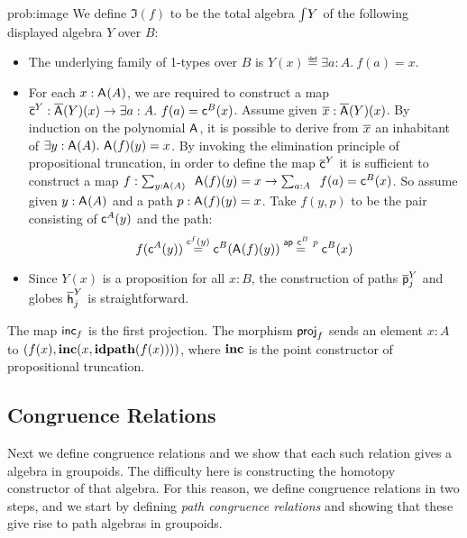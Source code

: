 \begin{construction}{prob:image}
We define $\Im(f)$ to be the total algebra $\textstyle \int_{}{Y}$ of the following displayed algebra $Y$ over $B$:
\begin{itemize}
\item The underlying family of 1-types over $B$ is $Y(x) \eqdef \exists a : A.\ f(a) = x$.
\item For each $x : \mathsf{A}^{}(A)$, we are required to construct
a map $\overline{\mathsf{c}}^{Y} : \overline{\mathsf{A}^{}}(Y)(x) \rightarrow
\exists a : A.\ f(a) = \mathsf{c}^{B}(x)$. Assume given $\overline{x}
: \overline{\mathsf{A}^{}}(Y)(x)$. By induction on the polynomial
$\mathsf{A}^{}$, it is possible to derive from $\overline{x}$ an
inhabitant of $\exists y
: \mathsf{A}^{}(A).\ \mathsf{A}^{}(f)(y) = x$. By
invoking the elimination principle of propositional truncation, in
order to define the map $\overline{\mathsf{c}}^{Y}$ it is sufficient to
construct a map $f : \Sum {y
: \polyAct{\pointconstr}{A}}.\ \polyAct{\pointconstr}{f}(y) =
x \rightarrow \Sum {a : A}.\ f(a) = \AlgPoint{B}(x)$.  So assume given
$y : \mathsf{A}^{}(A)$ and a path $p
: \mathsf{A}^{}(f)(y) = x$. Take $f(y,p)$ to be the pair
consisting of $\mathsf{c}^{A}(y)$ and the path:
\[
f(\mathsf{c}^{A}(y))
\stackrel{\mathsf{c}^{f}(y)}{=}
\mathsf{c}^{B}(\mathsf{A}^{}(f)(y))
\stackrel{\mathsf{ap} \ \mathsf{c}^{B} \ p}{=}
\mathsf{c}^{B}(x)
\]
\item Since $Y(x)$ is a proposition for all $x : B$, the construction of
paths $\overline{\mathsf{p}}^{Y}_{j}$ and globes $\overline{\mathsf{h}}^{Y}_{j}$ is
straightforward.
\end{itemize}

The map $\mathsf{inc}_{f}$ is the first projection.
The morphism $\mathsf{proj}_{f}$ sends an element $x : A$ to
$(f(x),\operatorname{\mathbf{inc}}(x,\operatorname{\mathbf{idpath}}(f(x))))$, where $\operatorname{\mathbf{inc}}$ is the point constructor of
propositional truncation. 
\end{construction}

\subsection{Congruence Relations}
Next we define congruence relations and we show that each such relation gives a algebra in groupoids.
The difficulty here is constructing the homotopy constructor of that algebra.
For this reason, we define congruence relations in two steps, and we start by defining \emph{path congruence relations} and showing that these give rise to path algebras in groupoids.

